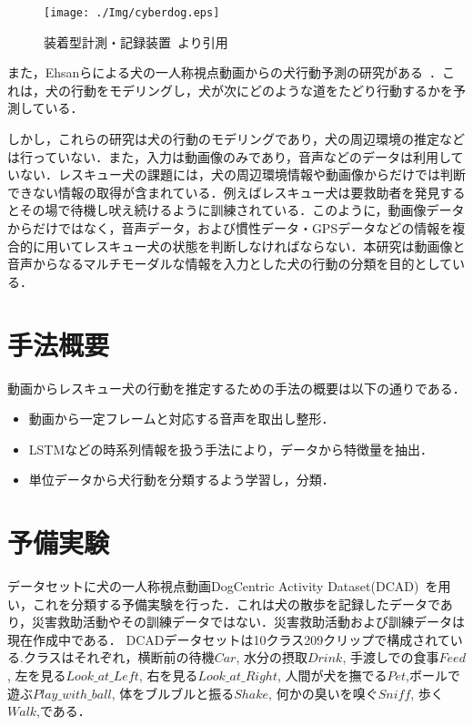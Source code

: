 \begin{figure}[htbp]
 \begin{center}
  \texttt{[image: ./Img/cyberdog.eps]}
  \caption{装着型計測・記録装置~\cite{dog01}より引用}
  \label{cyber}
 \end{center}
\end{figure}

また，Ehsanらによる犬の一人称視点動画からの犬行動予測の研究がある~\cite{whoretthedog}．これは，犬の行動をモデリングし，犬が次にどのような道をたどり行動するかを予測している．

しかし，これらの研究は犬の行動のモデリングであり，犬の周辺環境の推定などは行っていない．また，入力は動画像のみであり，音声などのデータは利用していない．レスキュー犬の課題には，犬の周辺環境情報や動画像からだけでは判断できない情報の取得が含まれている．例えばレスキュー犬は要救助者を発見するとその場で待機し吠え続けるように訓練されている．このように，動画像データからだけではなく，音声データ，および慣性データ・GPSデータなどの情報を複合的に用いてレスキュー犬の状態を判断しなければならない．本研究は動画像と音声からなるマルチモーダルな情報を入力とした犬の行動の分類を目的としている． 

\section{手法概要}
動画からレスキュー犬の行動を推定するための手法の概要は以下の通りである．
\begin{itemize}
 \item 動画から一定フレームと対応する音声を取出し整形．
 \item LSTMなどの時系列情報を扱う手法により，データから特徴量を抽出．
 \item 単位データから犬行動を分類するよう学習し，分類．
\end{itemize}

\section{予備実験}
データセットに犬の一人称視点動画DogCentric Activity Dataset(DCAD)~\cite{yumi2014first}を用い，これを分類する予備実験を行った．これは犬の散歩を記録したデータであり，災害救助活動やその訓練データではない．災害救助活動および訓練データは現在作成中である．
DCADデータセットは10クラス209クリップで構成されている.クラスはそれぞれ，横断前の待機\(Car\), 水分の摂取\(Drink\), 手渡しでの食事\(Feed\), 左を見る\(Look\_at\_Left\), 右を見る\(Look\_at\_Right\), 人間が犬を撫でる\(Pet\),ボールで遊ぶ\(Play\_with\_ball\), 体をブルブルと振る\(Shake\), 何かの臭いを嗅ぐ\(Sniff\), 歩く\(Walk\),である．

